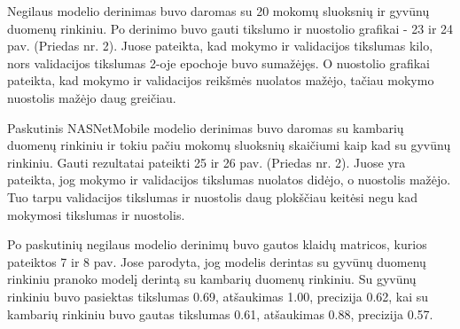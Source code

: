 \documentclass{VUMIFPSbakalaurinis}
\begin{document}
Negilaus modelio derinimas buvo daromas su 20 mokomų sluoksnių ir gyvūnų duomenų rinkiniu.
Po derinimo buvo gauti tikslumo ir nuostolio grafikai - 23 ir 24 pav. (Priedas nr. 2). Juose pateikta, kad mokymo ir validacijos tikslumas kilo, nors validacijos tikslumas 2-oje epochoje buvo sumažėjęs. O nuostolio grafikai pateikta, kad mokymo ir validacijos reikšmės nuolatos mažėjo, tačiau mokymo nuostolis mažėjo daug greičiau.

Paskutinis NASNetMobile modelio derinimas buvo daromas su kambarių duomenų rinkiniu ir tokiu pačiu mokomų sluoksnių skaičiumi kaip kad su gyvūnų rinkiniu. 
Gauti rezultatai pateikti 25 ir 26 pav. (Priedas nr. 2). Juose yra pateikta, jog mokymo ir validacijos tikslumas nuolatos didėjo, o nuostolis mažėjo. Tuo tarpu validacijos tikslumas ir nuostolis daug plokščiau keitėsi negu kad mokymosi tikslumas ir nuostolis.

Po paskutinių negilaus modelio derinimų buvo gautos klaidų matricos, kurios pateiktos 7 ir 8 pav. Jose parodyta, jog modelis derintas su gyvūnų duomenų rinkiniu pranoko modelį derintą su kambarių duomenų rinkiniu.
Su gyvūnų rinkiniu buvo pasiektas tikslumas 0.69, atšaukimas 1.00, precizija 0.62, kai su kambarių rinkiniu buvo gautas tikslumas 0.61, atšaukimas 0.88, precizija 0.57.
\end{document}
